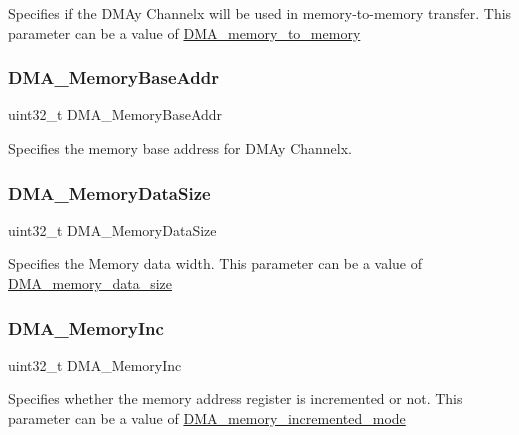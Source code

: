 Specifies if the D\+M\+Ay Channelx will be used in memory-\/to-\/memory transfer. This parameter can be a value of \mbox{\hyperlink{group___d_m_a__memory__to__memory}{D\+M\+A\+\_\+memory\+\_\+to\+\_\+memory}} \mbox{\label{struct_d_m_a___init_type_def_aef38e2f4497b0522b21dfc9d54753ccf}} 
\subsubsection{\texorpdfstring{DMA\_MemoryBaseAddr}{DMA\_MemoryBaseAddr}}
{\footnotesize\ttfamily uint32\+\_\+t D\+M\+A\+\_\+\+Memory\+Base\+Addr}

Specifies the memory base address for D\+M\+Ay Channelx. \mbox{\label{struct_d_m_a___init_type_def_a7ec1648d136d31d6c504565bf6949eb6}} 
\subsubsection{\texorpdfstring{DMA\_MemoryDataSize}{DMA\_MemoryDataSize}}
{\footnotesize\ttfamily uint32\+\_\+t D\+M\+A\+\_\+\+Memory\+Data\+Size}

Specifies the Memory data width. This parameter can be a value of \mbox{\hyperlink{group___d_m_a__memory__data__size}{D\+M\+A\+\_\+memory\+\_\+data\+\_\+size}} \mbox{\label{struct_d_m_a___init_type_def_ad8f8a0f3ba4db5d79fd78d02093e4eb9}} 
\subsubsection{\texorpdfstring{DMA\_MemoryInc}{DMA\_MemoryInc}}
{\footnotesize\ttfamily uint32\+\_\+t D\+M\+A\+\_\+\+Memory\+Inc}

Specifies whether the memory address register is incremented or not. This parameter can be a value of \mbox{\hyperlink{group___d_m_a__memory__incremented__mode}{D\+M\+A\+\_\+memory\+\_\+incremented\+\_\+mode}} \mbox{\label{struct_d_m_a___init_type_def_a5f09c16a03a50120c1a1a49ae6a7c667}} 
